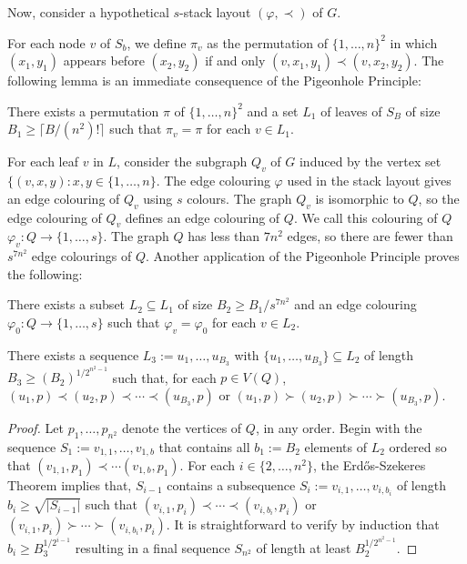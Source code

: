 \documentclass[kpfonts]{patmorin}
\begin{document}
Now, consider a hypothetical $s$-stack layout $(\varphi,\prec)$ of $G$.

For each node $v$ of $S_b$, we define $\pi_v$ as the permutation of $\{1,\ldots,n\}^2$ in which $(x_1,y_1)$ appears before $(x_2,y_2)$ if and only $(v,x_1,y_1)\prec (v,x_2,y_2)$.  The following lemma is an immediate consequence of the Pigeonhole Principle:

\begin{lem}
    There exists a permutation $\pi$ of $\{1,\ldots,n\}^2$ and a set $L_1$ of leaves of $S_B$ of size $B_1\ge \lceil B/(n^2)!\rceil$ such that $\pi_{v}=\pi$ for each $v\in L_1$.
\end{lem}

For each leaf $v$ in $L$, consider the subgraph $Q_v$ of $G$ induced by the vertex set $\{(v,x,y):x,y\in\{1,\ldots,n\}$.  The edge colouring $\varphi$ used in the stack layout gives an edge colouring of $Q_v$ using $s$ colours.  The graph $Q_v$ is isomorphic to $Q$, so the edge colouring of $Q_v$ defines an edge colouring of $Q$.  We call this colouring of $Q$ $\varphi_v:Q\to\{1,\ldots,s\}$.  The graph $Q$ has less than $7n^2$ edges, so there are fewer than $s^{7n^2}$ edge colourings of $Q$.  Another application of the Pigeonhole Principle proves the following:

\begin{lem}
    There exists a subset $L_2\subseteq L_1$ of size $B_2\ge B_1/s^{7n^2}$
    and an edge colouring $\varphi_0:Q\to\{1,\ldots,s\}$ such that $\varphi_v=\varphi_0$ for each $v\in L_2$.
\end{lem}



\begin{lem}
    There exists a sequence $L_3:=u_1,\ldots,u_{B_3}$ with $\{u_1,\ldots,u_{B_3}\}\subseteq L_2$ of length $B_3\ge (B_2)^{1/2^{n^2-1}}$ such that, for each $p\in V(Q)$, $(u_1,p)\prec (u_2,p)\prec\cdots\prec (u_{B_3},p)$ or $(u_1,p)\succ (u_2,p)\succ\cdots\succ (u_{B_3},p)$.
\end{lem}

\begin{proof}
    Let $p_1,\ldots,p_{n^2}$ denote the vertices of $Q$, in any order.
    Begin with the sequence $S_1:=v_{1,1},\ldots,v_{1,b}$ that contains all $b_1:=B_2$ elements of $L_2$ ordered so that $(v_{1,1},p_1)\prec\cdots(v_{1,b},p_1)$.  For each $i\in\{2,\ldots,n^2\}$, the Erd\H{o}s-Szekeres Theorem implies that, $S_{i-1}$ contains a subsequence $S_i:=v_{i,1},\ldots,v_{i,b_i}$ of length $b_i\ge \sqrt{|S_{i-1}|}$ such that $(v_{i,1},p_i)\prec\cdots\prec(v_{i,b_i},p_i)$ or $(v_{i,1},p_i)\succ\cdots\succ(v_{i,b_i},p_i)$.  It is straightforward to verify by induction that $b_i \ge B_3^{1/2^{i-1}}$ resulting in a final sequence $S_{n^2}$ of length at least $B_2^{1/2^{n^2-1}}$.
\end{proof}
\end{document}
